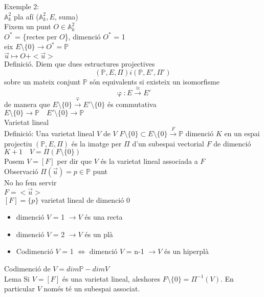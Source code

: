 \documentclass{article}
\newcommand{\A}{\mathds{A}}
\begin{document}
Exemple 2:\\
$\A^2_k$ pla afí ($\A^2_k, E$, suma)\\
Fixem un punt $O \in \A^2_k$\\
$O^*$ = \{rectes per $O$\}, dimenció $O^*$ = 1\\
eix $E\setminus\{0\} \to O^* = \mathds{P}$\\
$\vec{u} \mapsto O + <\vec{u}>$\\

Definició. Diem que dues estructures projectives $$(\mathds{P}, E, \Pi) i (\mathds{P}, E', \Pi')$$
sobre un mateix conjunt $\mathds{P}$ són equivalents si existeix un isomorfisme
$$\upvarphi: E \xrightarrow{\cong} E'$$
de manera que $E\setminus\{0\} \xrightarrow{\upvarphi} E'\setminus\{0\}$ és commutativa\\
$E\setminus\{0\} \to \mathds{P}\quad E'\setminus\{0\} \to \mathds{P}$\\

Varietat lineal\\
Definició: Una varietat lineal $V$ de $V$ $F\setminus\{0\} \subset E\setminus\{0\} \xrightarrow{F} \mathds{P}$ dimenció $K$ en un espai projectiu $(\mathds{P}, E, \Pi)$ és la imatge per $\Pi$ d'un subespai vectorial $F$ de dimenció $K+1\quad V=\Pi(F\setminus\{0\})$\\
Posem $V = [F]$ per dir que $V$ és la varietat lineal associada a $F$\\

Observació $\Pi(\vec{u}) = p \in \mathds{P}$ punt\\

No ho fem servir\\
$F = <\vec{u}>$\\
$[F] = \{p\}$ varietat lineal de dimenció 0\\

\begin{itemize}
\item dimenció $V$ = 1 $\to V$ és una recta
\item dimenció $V$ = 2 $\to V$ és un plà
\item Codimenció $V$ = 1 $\Leftrightarrow$ dimenció $V$ = n-1 $\to V$ és un hiperplà
\end{itemize}

Codimenció de $V = dim \mathds{P} - dim V$\\

Lema Si $V = [F]$ és una varietat lineal, aleshores $F\setminus\{0\} = \Pi^{-1}(V)$. En particular $V$ només té un subespai associat.\\
\end{document}
